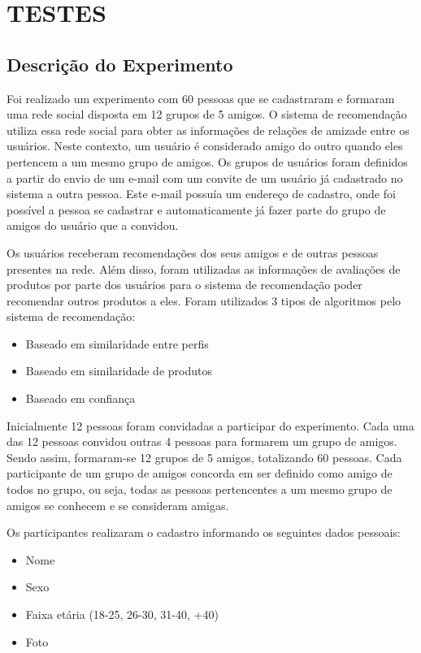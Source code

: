 \chapter{TESTES} %
\label{cha:testes} %

\section{Descrição do Experimento}
\label{cha:descricao_do_experimento}

 Foi realizado um experimento com 60 pessoas que se cadastraram e formaram uma rede social disposta em 12 grupos de 5 amigos. O sistema de recomendação utiliza essa rede social para obter as informações de relações de amizade entre os usuários. Neste contexto, um usuário é considerado amigo do outro quando eles pertencem a um mesmo grupo de amigos. Os grupos de usuários foram definidos a partir do envio de um e-mail com um convite de um usuário já cadastrado no sistema a outra pessoa. Este e-mail possuía um endereço de cadastro, onde foi possível a pessoa se cadastrar e automaticamente já fazer parte do grupo de amigos do usuário que a convidou.

 Os usuários receberam recomendações dos seus amigos e de outras pessoas presentes na rede. Além disso, foram utilizadas as informações de avaliações de produtos por parte dos usuários para o sistema de recomendação poder recomendar outros produtos a eles. Foram utilizados 3 tipos de algoritmos pelo sistema de recomendação:

\begin{itemize}
	\item Baseado em similaridade entre perfis
	\item Baseado em similaridade de produtos
	\item Baseado em confiança
\end{itemize}
 
 Inicialmente 12 pessoas foram convidadas a participar do experimento. Cada uma das 12 pessoas convidou outras 4 pessoas para formarem um grupo de amigos. Sendo assim, formaram-se 12 grupos de 5 amigos, totalizando 60 pessoas. Cada participante de um grupo de amigos concorda em ser definido como amigo de todos no grupo, ou seja, todas as pessoas pertencentes a um mesmo grupo de amigos se conhecem e se consideram amigas.

 Os participantes realizaram o cadastro informando os seguintes dados pessoais:

\begin{itemize}
	\item Nome
	\item Sexo
	\item Faixa etária (18-25, 26-30, 31-40, +40)
	\item Foto
\end{itemize}

